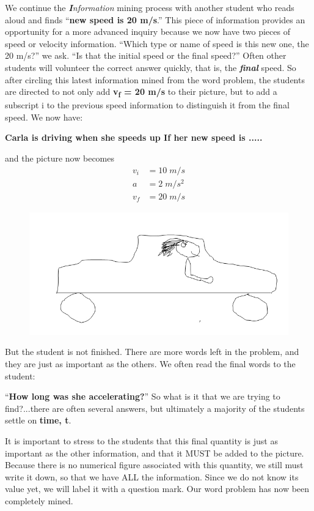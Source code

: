 \documentclass[11.5pt]{sig-alternate} %
\begin{document}
\begin{large}
We continue the \textit{\textbf{I}nformation} mining process with another student who reads aloud and finds “\textbf{new speed is 20 m/s}.”  This piece of information provides an opportunity for a more advanced inquiry because we now have two pieces of speed or velocity information.  “Which type or name of speed is this new one, the 20 m/s?” we ask.  “Is that the initial speed or the final speed?”  Often other students will volunteer the correct answer quickly, that is, the \textbf{\textit{final}} speed.  So after circling this latest information mined from the word problem, the students are directed to not only add \textbf{v\textsubscript{f}  = 20 m/s} to their picture, but to add a subscript i to the previous speed information to distinguish it from the final speed.  We now have:

\textbf{Carla is driving  when she speeds up  If her new speed is .....}

and the picture now becomes
\begin{align*}
    v_{i} &= 10\;m/s \\
    a &= 2\;m/s^{2} \\
    v_{f} &= 20\;m/s
\end{align*}
\begin{figure}[h]
    \includegraphics[width=1\linewidth]{img1.jpg}
\end{figure}

But the student is not finished.  There are more words left in the problem, and they are just as important as the others.  We often read the final words to the student:

“\textbf{How long was she accelerating?}” So what is it that we are trying to find?...there are often several answers, but ultimately a majority of the students settle on \textbf{time, t}. 

It is important to stress to the students that this final quantity is just as important as the other information, and that it MUST be added to the picture.  Because there is no numerical figure associated with this quantity, we still must write it down, so that we have ALL the information.  Since we do not know its value yet, we will label it with a question mark.  Our word problem has now been completely mined.


\end{large}
\end{document}
